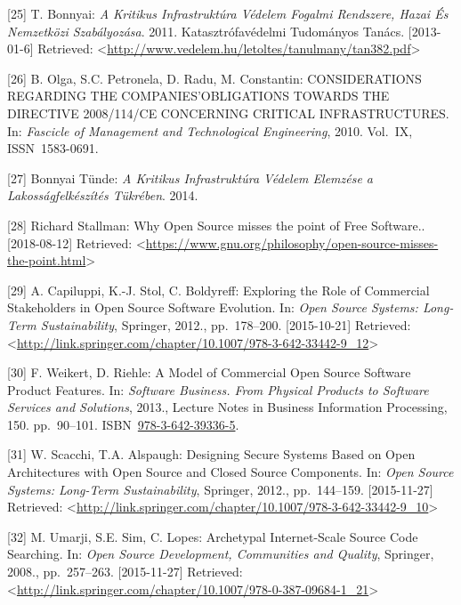 \documentclass[12pt,magyar,a4paper,oneside]{scrreprt}
\begin{document}
\leavevmode\hypertarget{ref-bonnyai_kritikus_2011}{}%
{[}25{]} T. Bonnyai: \emph{A Kritikus Infrastruktúra Védelem Fogalmi
Rendszere, Hazai És Nemzetközi Szabályozása}. 2011. Katasztrófavédelmi
Tudományos Tanács. {[}2013-01-6{]} Retrieved:
\textless{}\url{http://www.vedelem.hu/letoltes/tanulmany/tan382.pdf}\textgreater{}

\leavevmode\hypertarget{ref-olga_considerations_2010}{}%
{[}26{]} B. Olga, S.C. Petronela, D. Radu, M. Constantin: CONSIDERATIONS
REGARDING THE COMPANIES'OBLIGATIONS TOWARDS THE DIRECTIVE 2008/114/CE
CONCERNING CRITICAL INFRASTRUCTURES. In: \emph{Fascicle of Management
and Technological Engineering}, 2010. Vol.~IX, ISSN~1583-0691.

\leavevmode\hypertarget{ref-bonnyai_tunde_kritikus_2014}{}%
{[}27{]} Bonnyai Tünde: \emph{A Kritikus Infrastruktúra Védelem Elemzése
a Lakosságfelkészítés Tükrében}. 2014.

\leavevmode\hypertarget{ref-richard_stallman_why_nodate}{}%
{[}28{]} Richard Stallman: Why Open Source misses the point of Free
Software.. {[}2018-08-12{]} Retrieved:
\textless{}\url{https://www.gnu.org/philosophy/open-source-misses-the-point.html}\textgreater{}

\leavevmode\hypertarget{ref-capiluppi_exploring_2012}{}%
{[}29{]} A. Capiluppi, K.-J. Stol, C. Boldyreff: Exploring the Role of
Commercial Stakeholders in Open Source Software Evolution. In:
\emph{Open Source Systems: Long-Term Sustainability}, Springer, 2012.,
pp.~178--200. {[}2015-10-21{]} Retrieved:
\textless{}\url{http://link.springer.com/chapter/10.1007/978-3-642-33442-9_12}\textgreater{}

\leavevmode\hypertarget{ref-weikert_model_2013}{}%
{[}30{]} F. Weikert, D. Riehle: A Model of Commercial Open Source
Software Product Features. In: \emph{Software Business. From Physical
Products to Software Services and Solutions}, 2013., Lecture Notes in
Business Information Processing, 150. pp.~90--101.
ISBN~\href{https://worldcat.org/isbn/978-3-642-39336-5}{978-3-642-39336-5}.

\leavevmode\hypertarget{ref-scacchi_designing_2012}{}%
{[}31{]} W. Scacchi, T.A. Alspaugh: Designing Secure Systems Based on
Open Architectures with Open Source and Closed Source Components. In:
\emph{Open Source Systems: Long-Term Sustainability}, Springer, 2012.,
pp.~144--159. {[}2015-11-27{]} Retrieved:
\textless{}\url{http://link.springer.com/chapter/10.1007/978-3-642-33442-9_10}\textgreater{}

\leavevmode\hypertarget{ref-umarji_archetypal_2008}{}%
{[}32{]} M. Umarji, S.E. Sim, C. Lopes: Archetypal Internet-Scale Source
Code Searching. In: \emph{Open Source Development, Communities and
Quality}, Springer, 2008., pp.~257--263. {[}2015-11-27{]} Retrieved:
\textless{}\url{http://link.springer.com/chapter/10.1007/978-0-387-09684-1_21}\textgreater{}
\end{document}
